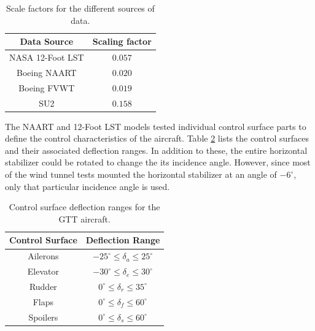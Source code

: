 \begin{table}
\centering
    \renewcommand{\arraystretch}{1.2}
    \captionsetup{justification=centering}
    \begin{tabular}{|c|c|}
        \hline
        Data Source & Scaling factor \\ \hline
        NASA 12-Foot LST & $0.057$ \\ \hline
        Boeing NAART & $0.020$ \\ \hline
        Boeing FVWT & $0.019$ \\ \hline
        SU2 & $0.158$\\ \hline
    \end{tabular}
    \caption{Scale factors for the different sources of data.}
    \label{tab:gtt_scale_factors}
\end{table}

The NAART and 12-Foot LST models tested individual control surface parts to define the control characteristics of the aircraft. 
Table \ref{tab:gtt_cs_range} lists the control surfaces and their associated deflection ranges.
In addition to these, the entire horizontal stabilizer could be rotated to change the its incidence angle. 
However, since most of the wind tunnel tests mounted the horizontal stabilizer at an angle of $-6^\circ$, only that particular incidence angle is used.

\begin{table}
    \renewcommand{\arraystretch}{1.2}
    \centering
    \begin{tabular}{ |c|c| } 
        \hline
        Control Surface & Deflection Range \\ \hline
         Ailerons &  $-25^\circ \leq \delta_a \leq 25^\circ$ \\ \hline
         Elevator &  $-30^\circ \leq \delta_e \leq 30^\circ$ \\ \hline
         Rudder & $0^\circ \leq \delta_r \leq 35^\circ$ \\ \hline
         Flaps & $0^\circ \leq \delta_f \leq 60^\circ$ \\ \hline
         Spoilers & $0^\circ \leq \delta_s \leq 60^\circ$ \\ \hline
    \end{tabular}
    \caption{Control surface deflection ranges for the GTT aircraft.}
    \label{tab:gtt_cs_range}
\end{table}

